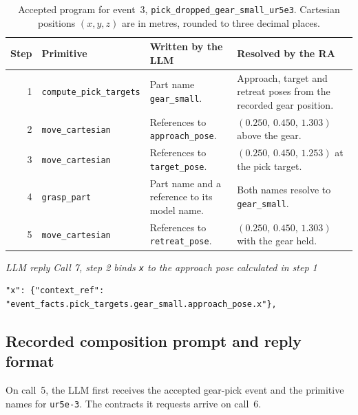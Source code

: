 \documentclass[preprint,12pt,authoryear]{elsarticle}
\let\code\nolinkurl
\newcommand{\recordlabel}[1]{\par\Needspace{4\baselineskip}\smallskip
  {\small\itshape #1\par}\nopagebreak}
\begin{document}
\begin{table}[H]
\centering\small
\caption{Accepted program for event~3, \code{pick_dropped_gear_small_ur5e3}. Cartesian positions $(x,y,z)$ are in metres, rounded to three decimal places.}\label{tab:pick}
\begin{tabularx}{\linewidth}{@{}r l Y Y@{}}
\toprule
Step & Primitive & Written by the LLM & Resolved by the RA \\
 & \code{compute_pick_targets} & Part name \code{gear_small}. & Approach, target and retreat poses from the recorded gear position. \\
2 & \code{move_cartesian} & References to \code{approach_pose}. & $(0.250,\,0.450,\,1.303)$ above the gear. \\
3 & \code{move_cartesian} & References to \code{target_pose}. & $(0.250,\,0.450,\,1.253)$ at the pick target. \\
4 & \code{grasp_part} & Part name and a reference to its model name. & Both names resolve to \code{gear_small}. \\
5 & \code{move_cartesian} & References to \code{retreat_pose}. & $(0.250,\,0.450,\,1.303)$ with the gear held. \\
\bottomrule
\end{tabularx}
\end{table}

\recordlabel{LLM reply \enspace Call 7, step 2 binds \texttt{x} to the approach pose calculated in step 1}
\begin{lstlisting}
"x": {"context_ref": "event_facts.pick_targets.gear_small.approach_pose.x"},
\end{lstlisting}

\subsection{Recorded composition prompt and reply format}\label{sec:composition-prompt}

On call~5, the LLM first receives the accepted gear-pick event and the
primitive names for \code{ur5e-3}. The contracts it requests arrive on call~6.
\end{document}
